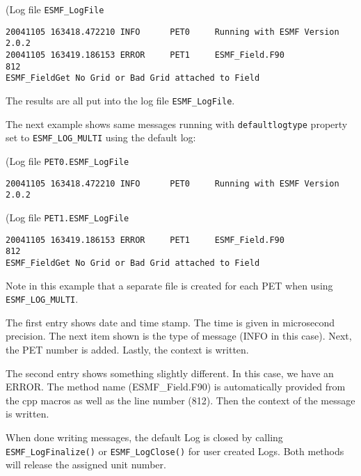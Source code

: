 (Log file {\tt ESMF\_LogFile}
\begin {verbatim}
20041105 163418.472210 INFO      PET0     Running with ESMF Version 2.0.2   
20041105 163419.186153 ERROR     PET1     ESMF_Field.F90             812  
ESMF_FieldGet No Grid or Bad Grid attached to Field
\end {verbatim}

The results are all put into the log file {\tt ESMF\_LogFile}.

The next example shows same messages running with {\tt defaultlogtype} 
property set to {\tt ESMF\_LOG\_MULTI} using the default log:

(Log file {\tt PET0.ESMF\_LogFile}
\begin {verbatim}
20041105 163418.472210 INFO      PET0     Running with ESMF Version 2.0.2   
\end {verbatim}

(Log file {\tt PET1.ESMF\_LogFile}
\begin {verbatim}
20041105 163419.186153 ERROR     PET1     ESMF_Field.F90             812  
ESMF_FieldGet No Grid or Bad Grid attached to Field
\end {verbatim}

Note in this example that a separate file is created for each PET when using
{\tt ESMF\_LOG\_MULTI}.

The first entry shows date and time stamp.  The time is given in microsecond 
precision.  The next item shown is the type of message (INFO in this case).  
Next, the PET number is added.  Lastly, the context is written.

The second entry shows something slightly different.  In this case, we have
an ERROR.  The method name (ESMF\_Field.F90) is automatically provided from 
the cpp macros as well as the line number (812).  Then the context of the 
message is written.
 
When done writing messages, the default Log is closed by calling 
{\tt ESMF\_LogFinalize()}  or {\tt ESMF\_LogClose()} for user created Logs.  
Both methods will release the assigned unit number.




